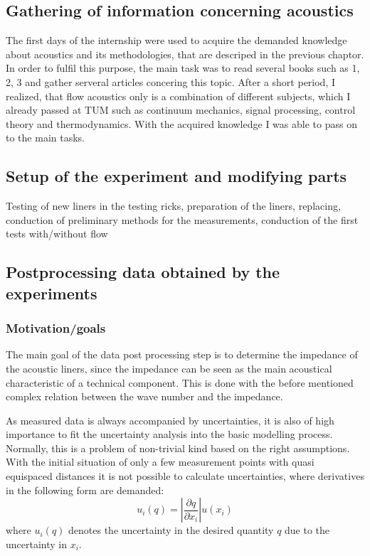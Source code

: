 \documentclass{article}
\begin{document}
\subsection{Gathering of information concerning acoustics } 
The first days of the internship were used to acquire the demanded knowledge about acoustics and its methodologies, that are descriped in the previous chaptor.
In order to fulfil this purpose, the main task was to read several books such as 1, 2, 3 and gather serveral articles concering this topic.
After a short period, I realized, that flow acoustics only is a combination of different subjects, which I already passed at TUM such as continuum mechanics, signal processing, control theory and thermodynamics.
With the acquired knowledge I was able to pass on to the main tasks. 
\subsection{Setup of the experiment and modifying parts}
Testing of new liners in the testing ricks, preparation of the liners, replacing, conduction of preliminary methods for the measurements, conduction of the first tests with/without flow

\subsection{Postprocessing data obtained by the experiments}

\subsubsection{Motivation/goals}
The main goal of the data post processing step is to determine the impedance of the acoustic liners, since the impedance can be seen as the main acoustical characteristic of a technical component.
This is done with the before mentioned complex relation between the wave number and the impedance.

As measured data is always accompanied by uncertainties, it is also of high importance to fit the uncertainty analysis into the basic modelling process.
Normally, this is a problem of non-trivial kind based on the right assumptions.
With the initial situation of only a few measurement points with quasi equispaced distances it is not possible to calculate uncertainties, where derivatives in the following form are demanded:
\begin{equation}
u_{i}(q)= \left\vert \frac{\partial q}{\partial x_{i}} \right\vert u( x_{i})
\end{equation}
where $u_{i}(q)$ denotes the uncertainty in the desired quantity $q$ due to the uncertainty in $x_{i}$.
\end{document}
